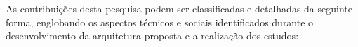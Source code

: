 


As contribuições desta pesquisa podem ser classificadas e detalhadas da seguinte forma, englobando os aspectos técnicos e sociais identificados durante o desenvolvimento da arquitetura proposta e a realização dos estudos:

